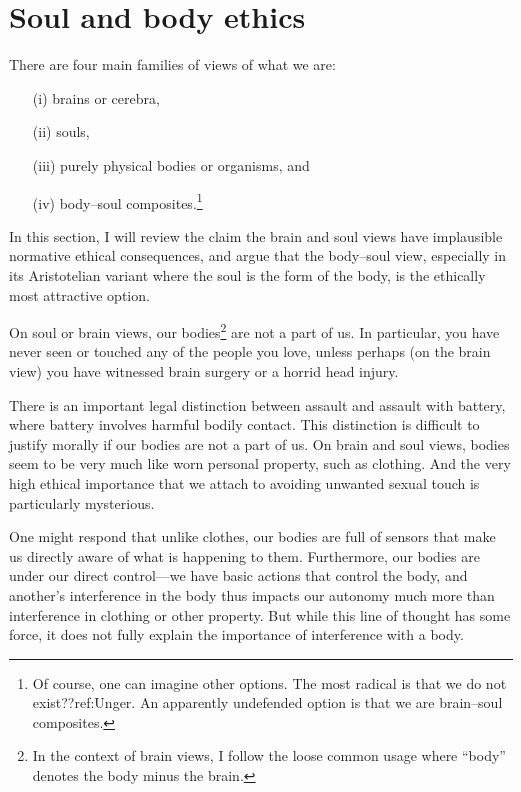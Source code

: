\section{Soul and body ethics}
There are four main families of views of what we are:
\begin{enumerate}
\item[(i)] brains or cerebra, 
\item[(ii)] souls, 
\item[(iii)] purely physical bodies or organisms, and 
\item[(iv)] body--soul composites.\footnote{Of course, one can imagine other options. The most radical is that we do not 
exist??ref:Unger. An apparently undefended option is that we are brain--soul composites.} 
\end{enumerate}
In this section, I will review 
the claim the brain and soul views have implausible normative ethical consequences, and argue that the body--soul view,
especially in its Aristotelian variant where the soul is the form of the body, is the ethically most attractive option.

On soul or brain views, our bodies\footnote{In the context of brain views, I follow the loose common usage
where ``body'' denotes the body minus the brain.} are not a part of us. In particular, you have never seen 
or touched any of the people you love, unless perhaps (on the brain view) you have witnessed brain surgery or 
a horrid head injury. 

There is an important legal distinction between assault and assault with battery, where
battery involves harmful bodily contact. This distinction is difficult to justify morally
if our bodies are not a part of us. On brain and soul views, bodies seem to be very much 
like worn personal property, such as clothing. And the very high ethical importance that we 
attach to avoiding unwanted sexual touch is particularly mysterious.

One might respond that unlike clothes, our bodies are full of sensors that make us directly
aware of what is happening to them. Furthermore, our bodies are under our direct control---we have 
basic actions that control the body, and another's interference in the body thus impacts our 
autonomy much more than interference in clothing or other property. But while this line of thought
has some force, it does not fully explain the importance of interference with a body. 

